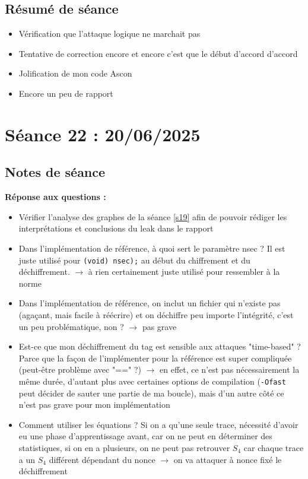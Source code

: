 \documentclass[12pt]{article}
\begin{document}
	\subsection{Résumé de séance}
	\begin{itemize}
		\item Vérification que l'attaque logique ne marchait pas
		\item Tentative de correction encore et encore c'est que le début d'accord d'accord
		\item Jolification de mon code Ascon
		\item Encore un peu de rapport
	\end{itemize}
	
	
	\section{Séance 22 : 20/06/2025}
	\subsection{Notes de séance}
	\textbf{Réponse aux questions :}
		\begin{itemize}
		\item Vérifier l'analyse des graphes de la séance \ref{s19} afin de pouvoir rédiger les interprétations et conclusions du leak dans le rapport
		\item Dans l'implémentation de référence, à quoi sert le paramètre nsec ? Il est juste utilisé pour \verb|(void) nsec);| au début du chiffrement et du déchiffrement. $\rightarrow$ à rien certainement juste utilisé pour ressembler à la norme
		\item Dans l'implémentation de référence, on inclut un fichier qui n'existe pas (agaçant, mais facile à réécrire) et on déchiffre peu importe l'intégrité, c'est un peu problématique, non ? $\rightarrow$ pas grave
		\item Est-ce que mon déchiffrement du tag est sensible aux attaques "time-based" ? Parce que la façon de l'implémenter pour la référence est super compliquée (peut-être problème avec "==" ?) $\rightarrow$ en effet, ce n'est pas nécessairement la même durée, d'autant plus avec certaines options de compilation (\verb|-Ofast| peut décider de sauter une partie de ma boucle), mais d'un autre côté ce n'est pas grave pour mon implémentation
		\item Comment utiliser les équations ? Si on a qu'une seule trace, nécessité d'avoir eu une phase d'apprentissage avant, car on ne peut en déterminer des statistiques, si on en a plusieurs, on ne peut pas retrouver $S_4$ car chaque trace a un $S_4$ différent dépendant du nonce $\rightarrow$ on va attaquer à nonce fixé le déchiffrement
	\end{itemize}
	
\end{document}
